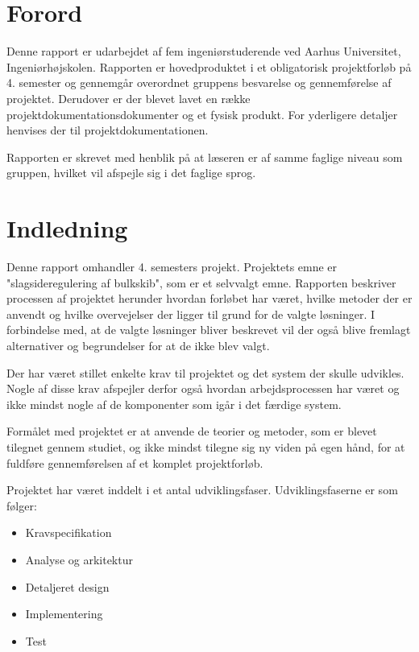 \chapter{Forord}
Denne rapport er udarbejdet af fem ingeniørstuderende ved Aarhus Universitet, Ingeniørhøjskolen. Rapporten er hovedproduktet i et obligatorisk projektforløb på 4. semester og gennemgår overordnet gruppens besvarelse og gennemførelse af projektet. Derudover er der blevet lavet en række projektdokumentationsdokumenter og et fysisk produkt. For yderligere detaljer henvises der til projektdokumentationen.
 
Rapporten er skrevet med henblik på at læseren er af samme faglige niveau som gruppen, hvilket vil afspejle sig i det faglige sprog. 

\chapter{Indledning}
Denne rapport omhandler 4. semesters projekt. Projektets emne er "slagsideregulering af bulkskib", som er et selvvalgt emne. Rapporten beskriver processen af projektet herunder hvordan forløbet har været, hvilke metoder der er anvendt og hvilke overvejelser der ligger til grund for de valgte løsninger. I forbindelse med, at de valgte løsninger bliver beskrevet vil der også blive fremlagt alternativer og begrundelser for at de ikke blev valgt.

Der har været stillet enkelte krav til projektet og det system der skulle udvikles. Nogle af disse krav afspejler derfor også hvordan arbejdsprocessen har været og ikke mindst nogle af de komponenter som igår i det færdige system. 

Formålet med projektet er at anvende de teorier og metoder, som er blevet tilegnet gennem studiet, og ikke mindst tilegne sig ny viden på egen hånd, for at fuldføre gennemførelsen af et komplet projektforløb.

Projektet har været inddelt i et antal udviklingsfaser. Udviklingsfaserne er som følger:
\begin{itemize}
\item Kravspecifikation
\item Analyse og arkitektur
\item Detaljeret design
\item Implementering
\item Test
\end{itemize}


